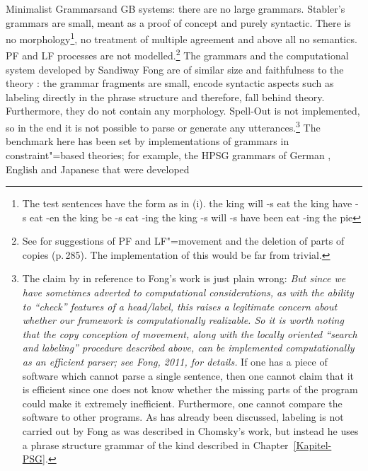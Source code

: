 Minimalist Grammars\indexmg and GB systems: there are no large grammars. Stabler's grammars are small, meant as a proof of concept and purely
syntactic. There is no morphology\footnote{%
	The test sentences have the form as in (i).
\eal
\ex the king will -s eat
\ex the king have -s eat -en
\ex the king be -s eat -ing
\ex the king -s will -s have been eat -ing the pie\vspace{-\baselineskip}%
\zllast%
}, no treatment of multiple agreement \citep[Section~27.4.3]{Stabler2010b} and above all no semantics. PF and LF
processes are not modelled.\footnote{%
	See \citet{SE2002a} for suggestions of PF and LF"=movement and the deletion of parts of copies (p.\,285).
	The implementation of this would be far from trivial.
} 
The grammars and the computational system developed by Sandiway Fong are of similar size and faithfulness
to the theory \citep{FG2012a,Fong2014a}: the grammar fragments are small,
encode syntactic aspects such as labeling directly in the phrase structure \citep[Section~4]{FG2012a} and therefore, fall behind \xbar theory.
Furthermore, they do not contain any morphology. Spell-Out is not implemented, so in the end it is not possible to parse or generate any 
utterances.\footnote{%
	The claim by \citet*[]{BPYC2011a} in reference to Fong's work is just plain wrong: \emph{But since we have
    sometimes adverted to computational considerations, as with the ability to ``check'' features of
    a head/label, this raises a legitimate concern about whether our framework is computationally
    realizable. So it is worth noting that the copy conception of movement, along with the locally
    oriented ``search and labeling'' procedure described above, can be implemented computationally
    as an efficient parser; see Fong, 2011, for details.} If one has a piece of software which cannot
	parse a single sentence, then one cannot claim that it is efficient since one does not know whether the 
	missing parts of the
	program could make it extremely inefficient. Furthermore, one cannot compare the software to other programs.
	As has already been discussed, labeling is not carried out by Fong as was described in
        Chomsky's work, but instead he uses a phrase structure grammar  of the kind described in Chapter~\ref{Kapitel-PSG}.%
}
The benchmark here has been set by implementations of grammars in constraint"=based theories; for example, the
HPSG grammars of German \citep{MK2000a}, English \citep*{FCS2000a}and
Japanese \citep{Siegel2000a} that were developed
